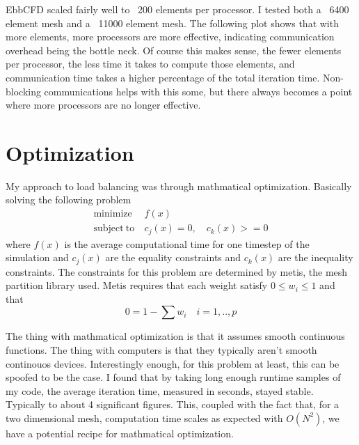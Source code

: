 \documentclass[12pt,parskip=full]{article}
\numberwithin{subsection}{section}
\begin{document}
		EbbCFD scaled fairly well to ~200 elements per processor. I tested both a ~6400 element mesh and a ~11000 element mesh. The following
		plot shows that with more elements, more processors are more effective, indicating communication overhead being the
		bottle neck. Of course this makes sense, the fewer elements per processor, the less time it takes to compute those elements,
		and communication time takes a higher percentage of the total iteration time. Non-blocking communications helps with this
		some, but there always becomes a point where more processors are no longer effective. 
		
		\begin{figure}[H]
			\centering
			\begin{subfigure}[H]{0.3\textwidth}
			\end{subfigure}
			\begin{subfigure}[H]{0.3\textwidth}
			\end{subfigure}
		\end{figure}

	\section{Optimization}
		My approach to load balancing was through mathmatical optimization. Basically solving the following problem
		\begin{align}
			\mathrm{minimize \ }& f(x) \\
			\mathrm{subject \ to \ } & c_j(x) = 0, \quad c_k(x) >= 0
		\end{align}
		where $f(x)$ is the average computational time for one timestep of the simulation and $c_j(x)$ are the equality constraints and 
		$c_k(x)$ are the inequality constraints. The constraints for this problem are determined by metis, the mesh partition library used.
		Metis requires that each weight satisfy $0 \le w_i \le 1$ and that
		\begin{equation}
			0 = 1 - \sum{w_i} \quad i = 1,..,p
		\end{equation}
		
		The thing with mathmatical optimization is that it assumes smooth continuous functions. The thing with computers is that they
		typically aren't smooth continouos devices. Interestingly enough, for this problem at least, this can be spoofed to be the case.
		I found that by taking long enough runtime samples of my code, the average iteration time, measured in seconds, stayed stable.
		Typically to about 4 significant figures. This, coupled with the fact that, for a two dimensional mesh, computation time scales
		as expected with $O(N^2)$, we have a potential recipe for mathmatical optimization. 
\end{document}
